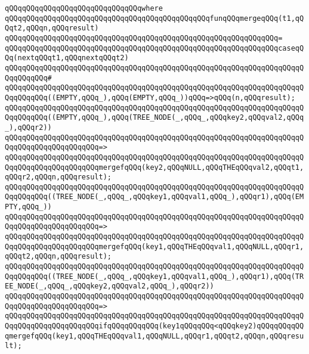 \verb|qQQqqQQqqQQqqQQqqQQqqQQqqQQqqQQqwhere|\newline
\verb|qQQqqQQqqQQqqQQqqQQqqQQqqQQqqQQqqQQqqQQqqQQqqQQqfunqQQqmergeqQQq(t1,qQQqt2,qQQqn,qQQqresult)|\newline
\verb|qQQqqQQqqQQqqQQqqQQqqQQqqQQqqQQqqQQqqQQqqQQqqQQqqQQqqQQqqQQqqQQq=|\newline
\verb|qQQqqQQqqQQqqQQqqQQqqQQqqQQqqQQqqQQqqQQqqQQqqQQqqQQqqQQqqQQqqQQqcaseqQQq(nextqQQqt1,qQQqnextqQQqt2)|\newline
\verb|qQQqqQQqqQQqqQQqqQQqqQQqqQQqqQQqqQQqqQQqqQQqqQQqqQQqqQQqqQQqqQQqqQQqqQQqqQQqqQQq#|\newline
\verb|qQQqqQQqqQQqqQQqqQQqqQQqqQQqqQQqqQQqqQQqqQQqqQQqqQQqqQQqqQQqqQQqqQQqqQQqqQQqqQQq((EMPTY,qQQq_),qQQq(EMPTY,qQQq_))qQQq=>qQQq(n,qQQqresult);|\newline
\newline
\verb|qQQqqQQqqQQqqQQqqQQqqQQqqQQqqQQqqQQqqQQqqQQqqQQqqQQqqQQqqQQqqQQqqQQqqQQqqQQqqQQq((EMPTY,qQQq_),qQQq(TREE_NODE(_,qQQq_,qQQqkey2,qQQqval2,qQQq_),qQQqr2))|\newline
\verb|qQQqqQQqqQQqqQQqqQQqqQQqqQQqqQQqqQQqqQQqqQQqqQQqqQQqqQQqqQQqqQQqqQQqqQQqqQQqqQQqqQQqqQQqqQQq=>|\newline
\verb|qQQqqQQqqQQqqQQqqQQqqQQqqQQqqQQqqQQqqQQqqQQqqQQqqQQqqQQqqQQqqQQqqQQqqQQqqQQqqQQqqQQqqQQqqQQqmergefqQQq(key2,qQQqNULL,qQQqTHEqQQqval2,qQQqt1,qQQqr2,qQQqn,qQQqresult);|\newline
\newline
\verb|qQQqqQQqqQQqqQQqqQQqqQQqqQQqqQQqqQQqqQQqqQQqqQQqqQQqqQQqqQQqqQQqqQQqqQQqqQQqqQQq((TREE_NODE(_,qQQq_,qQQqkey1,qQQqval1,qQQq_),qQQqr1),qQQq(EMPTY,qQQq_))|\newline
\verb|qQQqqQQqqQQqqQQqqQQqqQQqqQQqqQQqqQQqqQQqqQQqqQQqqQQqqQQqqQQqqQQqqQQqqQQqqQQqqQQqqQQqqQQqqQQq=>|\newline
\verb|qQQqqQQqqQQqqQQqqQQqqQQqqQQqqQQqqQQqqQQqqQQqqQQqqQQqqQQqqQQqqQQqqQQqqQQqqQQqqQQqqQQqqQQqqQQqmergefqQQq(key1,qQQqTHEqQQqval1,qQQqNULL,qQQqr1,qQQqt2,qQQqn,qQQqresult);|\newline
\newline
\verb|qQQqqQQqqQQqqQQqqQQqqQQqqQQqqQQqqQQqqQQqqQQqqQQqqQQqqQQqqQQqqQQqqQQqqQQqqQQqqQQq((TREE_NODE(_,qQQq_,qQQqkey1,qQQqval1,qQQq_),qQQqr1),qQQq(TREE_NODE(_,qQQq_,qQQqkey2,qQQqval2,qQQq_),qQQqr2))|\newline
\verb|qQQqqQQqqQQqqQQqqQQqqQQqqQQqqQQqqQQqqQQqqQQqqQQqqQQqqQQqqQQqqQQqqQQqqQQqqQQqqQQqqQQqqQQqqQQq=>|\newline
\verb|qQQqqQQqqQQqqQQqqQQqqQQqqQQqqQQqqQQqqQQqqQQqqQQqqQQqqQQqqQQqqQQqqQQqqQQqqQQqqQQqqQQqqQQqqQQqifqQQqqQQqqQQq(key1qQQqqQQq<qQQqkey2)qQQqqQQqqQQqmergefqQQq(key1,qQQqTHEqQQqval1,qQQqNULL,qQQqr1,qQQqt2,qQQqn,qQQqresult);|\newline
